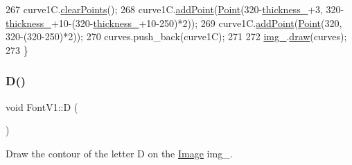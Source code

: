 \begin{DoxyCode}
267     curve1C.\mbox{\hyperlink{class_bezier_curve_a0ba8ce66d5af5971ae6a1b506029728e}{clearPoints}}();
268     curve1C.\mbox{\hyperlink{class_bezier_curve_a38d16c18b36ae45619b05e26e226cf34}{addPoint}}(\mbox{\hyperlink{class_point}{Point}}(320-\mbox{\hyperlink{class_font_v1_aed8040e76be9a52833627b92f0fb4e5f}{thickness\_}}+3, 320-
      \mbox{\hyperlink{class_font_v1_aed8040e76be9a52833627b92f0fb4e5f}{thickness\_}}+10-(320-\mbox{\hyperlink{class_font_v1_aed8040e76be9a52833627b92f0fb4e5f}{thickness\_}}+10-250)*2));
269     curve1C.\mbox{\hyperlink{class_bezier_curve_a38d16c18b36ae45619b05e26e226cf34}{addPoint}}(\mbox{\hyperlink{class_point}{Point}}(320, 320-(320-250)*2));
270     curves.push\_back(curve1C);
271 
272     \mbox{\hyperlink{class_font_v1_a00569e3e3c4b70f437b63f396f735fb0}{img\_}}.\mbox{\hyperlink{class_image_a8d162f3cab956131d58708c09aa560b0}{draw}}(curves);
273 \}
\end{DoxyCode}
\mbox{\label{class_font_v1_a3f4558aabfef6e0783c2294aecf215d0}} 
\subsubsection{\texorpdfstring{D()}{D()}}
{\footnotesize\ttfamily void Font\+V1\+::D (\begin{DoxyParamCaption}{ }\end{DoxyParamCaption})}



Draw the contour of the letter D on the \mbox{\hyperlink{class_image}{Image}} img\+\_\+. 


